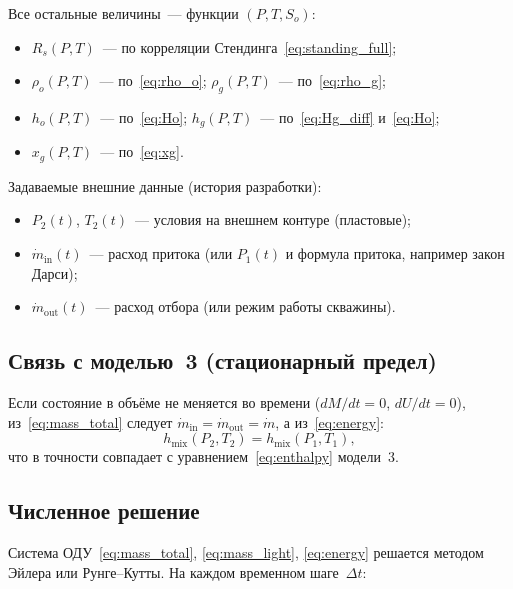 \documentclass[12pt,a4paper]{article}
\begin{document}
Все остальные величины~--- функции $(P, T, S_o)$:
\begin{itemize}[nosep]
  \item $R_s(P,T)$~--- по корреляции Стендинга~\eqref{eq:standing_full};
  \item $\rho_o(P,T)$~--- по~\eqref{eq:rho_o};\quad
        $\rho_g(P,T)$~--- по~\eqref{eq:rho_g};
  \item $h_o(P,T)$~--- по~\eqref{eq:Ho};\quad
        $h_g(P,T)$~--- по~\eqref{eq:Hg_diff} и~\eqref{eq:Ho};
  \item $x_g(P,T)$~--- по~\eqref{eq:xg}.
\end{itemize}

Задаваемые внешние данные (история разработки):
\begin{itemize}[nosep]
  \item $P_2(t)$, $T_2(t)$~--- условия на внешнем контуре (пластовые);
  \item $\dot{m}_{\text{in}}(t)$~--- расход притока
        (или $P_1(t)$ и формула притока, например закон Дарси);
  \item $\dot{m}_{\text{out}}(t)$~--- расход отбора (или режим работы скважины).
\end{itemize}

\subsection{Связь с моделью~3 (стационарный предел)}

Если состояние в объёме не меняется во времени ($dM/dt = 0$, $dU/dt = 0$),
из~\eqref{eq:mass_total} следует $\dot{m}_{\text{in}} =
\dot{m}_{\text{out}} = \dot{m}$, а из~\eqref{eq:energy}:
\begin{equation}
  h_{\mathrm{mix}}(P_2, T_2) = h_{\mathrm{mix}}(P_1, T_1),
\end{equation}
что в точности совпадает с уравнением~\eqref{eq:enthalpy} модели~3.

\subsection{Численное решение}

Система ОДУ~\eqref{eq:mass_total}, \eqref{eq:mass_light}, \eqref{eq:energy}
решается методом Эйлера или Рунге--Кутты. На каждом временном шаге~$\Delta t$:
\end{document}
